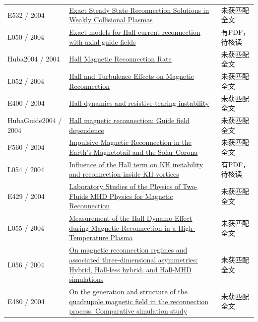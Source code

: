 \begin{longtable}{P{24mm}P{97mm}P{27mm}}
E532 / 2004 & \href{https://doi.org/10.1086/425646}{Exact Steady State Reconnection Solutions in Weakly Collisional Plasmas} & 未获匹配全文\\

L050 / 2004 & \href{https://doi.org/10.1063/1.1826094}{Exact models for Hall current reconnection with axial guide fields} & 有PDF，待核读\\

Huba2004 / 2004 & \href{https://doi.org/10.1103/physrevlett.93.175003}{Hall Magnetic Reconnection Rate} & 未获匹配全文\\

L052 / 2004 & \href{https://doi.org/10.1029/2003gl018689}{Hall and Turbulence Effects on Magnetic Reconnection} & 未获匹配全文\\

E400 / 2004 & \href{https://doi.org/10.1017/s0022377804002880}{Hall dynamics and resistive tearing instability} & 未获匹配全文\\

HubaGuide2004 / 2004 & \href{https://doi.org/10.1063/1.1834592}{Hall magnetic reconnection: Guide field dependence} & 未获匹配全文\\

F560 / 2004 & \href{https://doi.org/10.1146/annurev.astro.42.053102.134039}{Impulsive Magnetic Reconnection in the Earth's Magnetotail and the Solar Corona} & 未获匹配全文\\

L054 / 2004 & \href{https://doi.org/10.5194/angeo-22-935-2004}{Influence of the Hall term on KH instability and reconnection inside KH vortices} & 有PDF，待核读\\

E429 / 2004 & \href{http://ui.adsabs.harvard.edu/abs/2004AGUFMSM51D..07Y/abstract}{Laboratory Studies of the Physics of Two-Fluids MHD Physics for Magnetic Reconnection} & 未获匹配全文\\

L055 / 2004 & \href{https://doi.org/10.1103/physrevlett.93.045002}{Measurement of the Hall Dynamo Effect during Magnetic Reconnection in a High-Temperature Plasma} & 未获匹配全文\\

L056 / 2004 & \href{https://doi.org/10.1029/2004ja010478}{On magnetic reconnection regimes and associated three‐dimensional asymmetries: Hybrid,  Hall‐less hybrid,  and Hall‐MHD simulations} & 未获匹配全文\\

E480 / 2004 & \href{https://doi.org/10.1029/2004gl019553}{On the generation and structure of the quadrupole magnetic field in the reconnection process: Comparative simulation study} & 未获匹配全文\\


\end{longtable}
